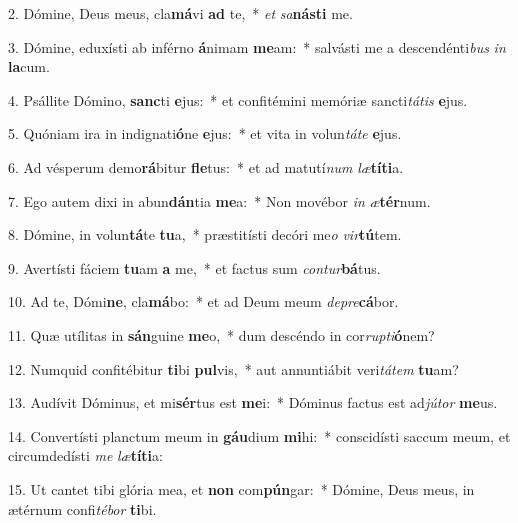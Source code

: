2. Dómine, Deus meus, cla\textbf{má}vi \textbf{ad} te,~*  \textit{et} \textit{sa}\textbf{nás}\textbf{ti} me.\

3. Dómine, eduxísti ab inférno \textbf{á}nimam \textbf{me}am:~*  salvásti me a descendénti\textit{bus} \textit{in} \textbf{la}cum.\

4. Psállite Dómino, \textbf{sanc}ti \textbf{e}jus:~*  et confitémini memóriæ sancti\textit{tá}\textit{tis} \textbf{e}jus.\

5. Quóniam ira in indignati\textbf{ó}ne \textbf{e}jus:~*  et vita in volun\textit{tá}\textit{te} \textbf{e}jus.\

6. Ad vésperum demo\textbf{rá}bitur \textbf{fle}tus:~*  et ad matutí\textit{num} \textit{læ}\textbf{tí}\textbf{ti}a.\

7. Ego autem dixi in abun\textbf{dán}tia \textbf{me}a:~*  Non movébor \textit{in} \textit{æ}\textbf{tér}num.\

8. Dómine, in volun\textbf{tá}te \textbf{tu}a,~*  præstitísti decóri me\textit{o} \textit{vir}\textbf{tú}tem.\

9. Avertísti fáciem \textbf{tu}am \textbf{a} me,~*  et factus sum \textit{con}\textit{tur}\textbf{bá}tus.\

10. Ad te, Dómi\textbf{ne}, cla\textbf{má}bo:~*  et ad Deum meum \textit{de}\textit{pre}\textbf{cá}bor.\

11. Quæ utílitas in \textbf{sán}guine \textbf{me}o,~*  dum descéndo in cor\textit{rup}\textit{ti}\textbf{ó}nem?\

12. Numquid confitébitur \textbf{ti}bi \textbf{pul}vis,~*  aut annuntiábit veri\textit{tá}\textit{tem} \textbf{tu}am?\

13. Audívit Dóminus, et mi\textbf{sér}tus est \textbf{me}i:~*  Dóminus factus est ad\textit{jú}\textit{tor} \textbf{me}us.\

14. Convertísti planctum meum in \textbf{gáu}dium \textbf{mi}hi:~*  conscidísti saccum meum, et circumdedísti \textit{me} \textit{læ}\textbf{tí}\textbf{ti}a:\

15. Ut cantet tibi glória mea, et \textbf{non} com\textbf{pún}gar:~*  Dómine, Deus meus, in ætérnum confi\textit{té}\textit{bor} \textbf{ti}bi.\


